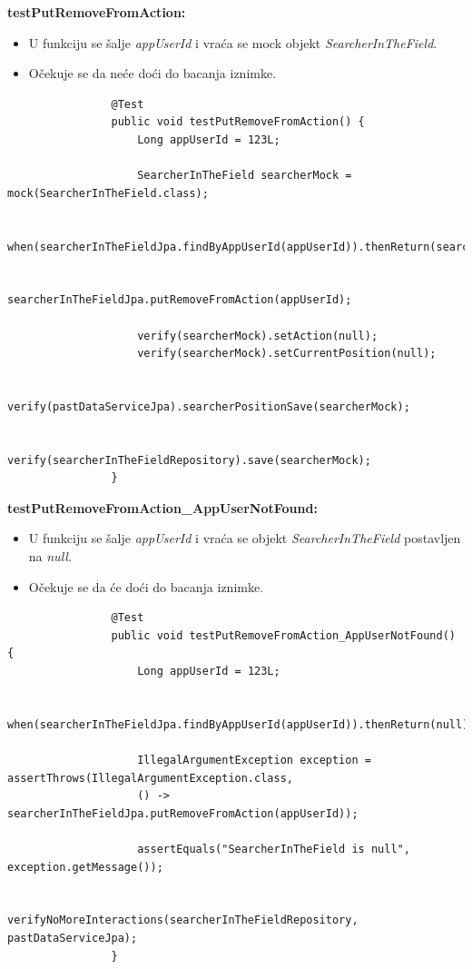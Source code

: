 			\textbf{testPutRemoveFromAction:}
			\begin{itemize}
				\item U funkciju se šalje \textit{appUserId} i vraća se mock objekt \textit{SearcherInTheField}.
				\item Očekuje se da neće doći do bacanja iznimke.
			\end{itemize}
			\begin{lstlisting}
				@Test
				public void testPutRemoveFromAction() {
					Long appUserId = 123L;
					
					SearcherInTheField searcherMock = mock(SearcherInTheField.class);
					
					when(searcherInTheFieldJpa.findByAppUserId(appUserId)).thenReturn(searcherMock);
					
					searcherInTheFieldJpa.putRemoveFromAction(appUserId);
					
					verify(searcherMock).setAction(null);
					verify(searcherMock).setCurrentPosition(null);
					
					verify(pastDataServiceJpa).searcherPositionSave(searcherMock);
					
					verify(searcherInTheFieldRepository).save(searcherMock);
				}
			\end{lstlisting}
			
			\textbf{testPutRemoveFromAction\_AppUserNotFound:}
			\begin{itemize}
				\item U funkciju se šalje \textit{appUserId} i vraća se objekt \textit{SearcherInTheField} postavljen na \textit{null}.
				\item Očekuje se da će doći do bacanja iznimke.
			\end{itemize}
			\begin{lstlisting}
				@Test
				public void testPutRemoveFromAction_AppUserNotFound() {
					Long appUserId = 123L;
					
					when(searcherInTheFieldJpa.findByAppUserId(appUserId)).thenReturn(null);
					
					IllegalArgumentException exception = assertThrows(IllegalArgumentException.class,
					() -> searcherInTheFieldJpa.putRemoveFromAction(appUserId));
					
					assertEquals("SearcherInTheField is null", exception.getMessage());
					
					verifyNoMoreInteractions(searcherInTheFieldRepository, pastDataServiceJpa);
				}
			\end{lstlisting}
			
